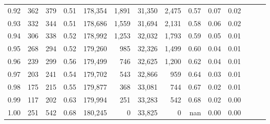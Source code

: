 \begin{tabular}{rrrrrrrrrrrrrr}
0.92 &    362 &  379 &  0.51 &  178,354 &    1,891 &  31,350 &   2,475 &  0.57 &  0.07 &      0.02 \\
0.93 &    332 &  344 &  0.51 &  178,686 &    1,559 &  31,694 &   2,131 &  0.58 &  0.06 &      0.02 \\
0.94 &    306 &  338 &  0.52 &  178,992 &    1,253 &  32,032 &   1,793 &  0.59 &  0.05 &      0.01 \\
0.95 &    268 &  294 &  0.52 &  179,260 &      985 &  32,326 &   1,499 &  0.60 &  0.04 &      0.01 \\
0.96 &    239 &  299 &  0.56 &  179,499 &      746 &  32,625 &   1,200 &  0.62 &  0.04 &      0.01 \\
0.97 &    203 &  241 &  0.54 &  179,702 &      543 &  32,866 &     959 &  0.64 &  0.03 &      0.01 \\
0.98 &    175 &  215 &  0.55 &  179,877 &      368 &  33,081 &     744 &  0.67 &  0.02 &      0.01 \\
0.99 &    117 &  202 &  0.63 &  179,994 &      251 &  33,283 &     542 &  0.68 &  0.02 &      0.00 \\
1.00 &    251 &  542 &  0.68 &  180,245 &        0 &  33,825 &       0 &   nan &  0.00 &      0.00 \\
\bottomrule
\end{tabular}
